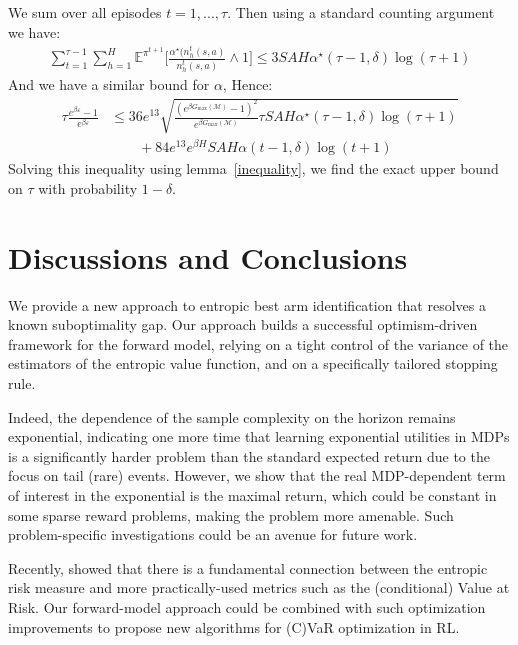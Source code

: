 \documentclass[final,12pt]{colt2026} %
\begin{document}
We sum over all episodes $t =1 , ...,\tau$. Then using a standard counting argument we have: 
\begin{align*}
    \sum_{t=1}^{\tau -1}\sum_{h=1}^H \mathbb{E}^{\pi^{t+1}}\Big[\frac{\alpha^\star\big(n_h^t(s,a)}{n_h^t(s,a)} \wedge 1 \Big] \leq 3 SAH\alpha^\star(\tau-1,\delta) \log(\tau + 1)
\end{align*}
And we have a similar bound for $\alpha$, Hence:
\begin{align*}
    \tau \frac{e^{\beta \varepsilon} - 1}{e^{\beta \varepsilon}} &\leq  36 e^{13}  \sqrt{\frac{(e^{\beta G_{\text{max}}(\mathcal{M})} - 1)^2}{e^{\beta G_{\text{max}}(\mathcal{M})}}\tau SAH\alpha^\star(\tau-1,\delta) \log(\tau + 1)} \\
    &\quad \quad + 84 e^{13} e^{\beta H}SAH\alpha(t-1,\delta) \log(t + 1)
\end{align*}
Solving this inequality using lemma~\ref{inequality}, we find the exact upper bound on $\tau$ with probability $1-\delta$. 




\section{Discussions and Conclusions}

We provide a new approach to entropic best arm identification that resolves a known suboptimality gap. Our approach builds a successful optimism-driven framework for the forward model, relying on a tight control of the variance of the estimators of the entropic value function, and on a specifically tailored stopping rule.  

Indeed, the dependence of the sample complexity on the horizon remains exponential, indicating one more time that learning exponential utilities in MDPs is a significantly harder problem than the standard expected return due to the focus on tail (rare) events. However, we show that the real MDP-dependent term of interest in the exponential is the maximal return, which could be constant in some sparse reward problems, making the problem more amenable. Such problem-specific investigations could be an avenue for future work. 

Recently, \citet{Marthe2025Efficient} showed that there is a fundamental connection between the entropic risk measure and more practically-used metrics such as the (conditional) Value at Risk. 
Our forward-model approach could be combined with such optimization improvements to propose new algorithms for (C)VaR optimization in RL. 
\end{document}
